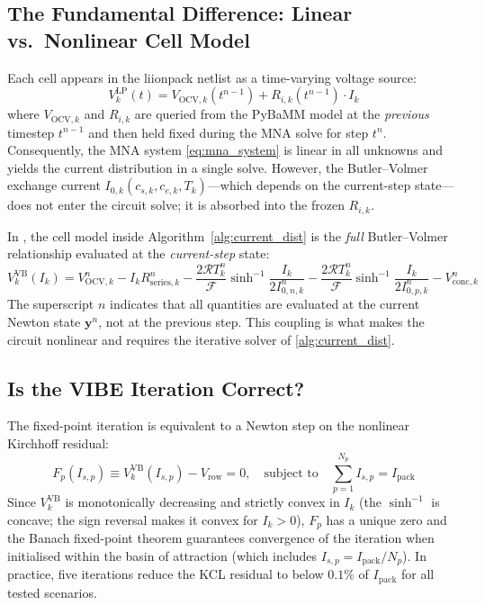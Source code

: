 \subsection{The Fundamental Difference: Linear vs.\ Nonlinear Cell Model}
\label{ssec:linear_vs_nonlinear}

Each cell appears in the liionpack netlist as a time-varying voltage source:
\begin{equation}
  V_k^\text{LP}(t) = V_{\text{OCV},k}(t^{n-1}) + R_{i,k}(t^{n-1}) \cdot I_k
  \label{eq:liionpack_cell_model}
\end{equation}
where $V_{\text{OCV},k}$ and $R_{i,k}$ are queried from the PyBaMM model at the \emph{previous} timestep $t^{n-1}$ and then held fixed during the MNA solve for step $t^n$. Consequently, the MNA system \cref{eq:mna_system} is linear in all unknowns and yields the current distribution in a single solve. However, the Butler--Volmer exchange current $I_{0,k}(c_{s,k}, c_{e,k}, T_k)$---which depends on the current-step state---does not enter the circuit solve; it is absorbed into the frozen $R_{i,k}$.

In \VIBE{}, the cell model inside Algorithm~\ref{alg:current_dist} is the \emph{full} Butler--Volmer relationship evaluated at the \emph{current-step} state:
\begin{equation}
  V_k^\text{VB}(I_k) = V_{\text{OCV},k}^n
    - I_k R_{\text{series},k}^n
    - \frac{2\mathcal{R}T_k^n}{\mathcal{F}}\sinh^{-1}\!\frac{I_k}{2I_{0,n,k}^n}
    - \frac{2\mathcal{R}T_k^n}{\mathcal{F}}\sinh^{-1}\!\frac{I_k}{2I_{0,p,k}^n}
    - V_{\text{conc},k}^n
  \label{eq:vibe_cell_model}
\end{equation}
The superscript $n$ indicates that all quantities are evaluated at the current Newton state $\mathbf{y}^n$, not at the previous step. This coupling is what makes the circuit nonlinear and requires the iterative solver of \cref{alg:current_dist}.

\subsection{Is the VIBE Iteration Correct?}
\label{ssec:bv_correctness}

The fixed-point iteration is equivalent to a Newton step on the nonlinear Kirchhoff residual:
\begin{equation}
  F_p(I_{s,p}) \equiv V_k^\text{VB}(I_{s,p}) - V_\text{row} = 0,
  \quad \text{subject to} \quad \sum_{p=1}^{N_p} I_{s,p} = I_\text{pack}
  \label{eq:kirchhoff_nonlinear}
\end{equation}
Since $V_k^\text{VB}$ is monotonically decreasing and strictly convex in $I_k$ (the $\sinh^{-1}$ is concave; the sign reversal makes it convex for $I_k > 0$), $F_p$ has a unique zero and the Banach fixed-point theorem guarantees convergence of the iteration when initialised within the basin of attraction (which includes $I_{s,p} = I_\text{pack}/N_p$). In practice, five iterations reduce the KCL residual to below $0.1\%$ of $I_\text{pack}$ for all tested scenarios.

